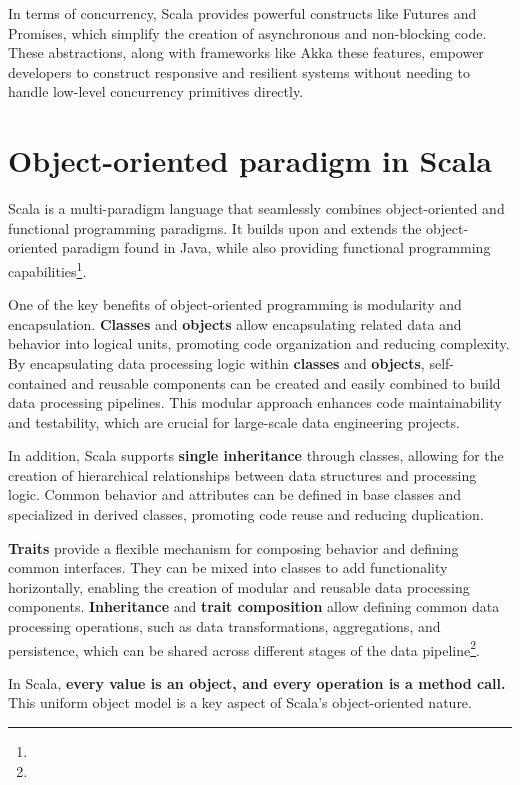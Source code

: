 In terms of concurrency, Scala provides powerful constructs like Futures and Promises, which simplify the creation of asynchronous and non-blocking code. These abstractions, along with frameworks like Akka these features, empower developers to construct responsive and resilient systems without needing to handle low-level concurrency primitives directly\footnotemark[2].

\section{Object-oriented paradigm in Scala}
Scala is a multi-paradigm language that seamlessly combines object-oriented and functional programming paradigms. It builds upon and extends the object-oriented paradigm found in Java, while also providing functional programming capabilities\footnote[4]{}.

One of the key benefits of object-oriented programming is modularity and encapsulation. \textbf{Classes} and \textbf{objects} allow encapsulating related data and behavior into logical units, promoting code organization and reducing complexity. By encapsulating data processing logic within \textbf{classes} and \textbf{objects}, self-contained and reusable components can be created and easily combined to build data processing pipelines. This modular approach enhances code maintainability and testability, which are crucial for large-scale data engineering projects\footnotemark[3].

In addition, Scala supports \textbf{single inheritance} through classes, allowing for the creation of hierarchical relationships between data structures and processing logic. Common behavior and attributes can be defined in base classes and specialized in derived classes, promoting code reuse and reducing duplication\footnotemark[3].

\textbf{Traits} provide a flexible mechanism for composing behavior and defining common interfaces. They can be mixed into classes to add functionality horizontally, enabling the creation of modular and reusable data processing components. \textbf{Inheritance} and \textbf{trait composition} allow defining common data processing operations, such as data transformations, aggregations, and persistence, which can be shared across different stages of the data pipeline\footnote[3]{}.

In Scala, \textbf{every value is an object, and every operation is a method call.} This uniform object model is a key aspect of Scala's object-oriented nature\footnotemark[3].


